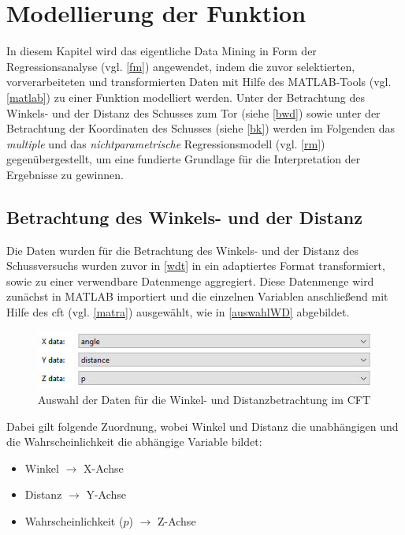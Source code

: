 \section{Modellierung der Funktion}
\label{mdf}
In diesem Kapitel wird das eigentliche Data Mining in Form der Regressionsanalyse (vgl. \vref{fm}) angewendet, indem die zuvor selektierten, vorverarbeiteten und transformierten Daten mit Hilfe des MATLAB-Tools (vgl. \vref{matlab}) zu einer Funktion modelliert werden. Unter der Betrachtung des Winkels- und der Distanz des Schusses zum Tor (siehe \vref{bwd}) sowie unter der Betrachtung der Koordinaten des Schusses (siehe \vref{bk}) werden im Folgenden das \textit{multiple} und das \textit{nichtparametrische} Regressionsmodell (vgl. \vref{rm}) gegenübergestellt, um eine fundierte Grundlage für die Interpretation der Ergebnisse zu gewinnen.


\subsection{Betrachtung des Winkels- und der Distanz}
\label{bwd}
Die Daten wurden für die Betrachtung des Winkels- und der Distanz des Schussversuchs wurden zuvor in \vref{wdt} in ein adaptiertes Format transformiert, sowie zu einer verwendbare Datenmenge aggregiert. Diese Datenmenge wird zunächst in MATLAB importiert und die einzelnen Variablen anschließend mit Hilfe des \gls{cft} (vgl. \vref{matra}) ausgewählt, wie in \vref{auswahlWD} abgebildet.

\begin{figure}[H]
\centering
\includegraphics[scale=0.8]{se-wa-jpg/auswahlWD}
\caption{Auswahl der Daten für die Winkel- und Distanzbetrachtung im CFT}
\label{auswahlWD}
\end{figure}

Dabei gilt folgende Zuordnung, wobei Winkel und Distanz die unabhängigen und die Wahrscheinlichkeit die abhängige Variable bildet:

\begin{itemize}
\item Winkel $\rightarrow$  X-Achse
\item Distanz $\rightarrow$ Y-Achse
\item Wahrscheinlichkeit ($p$) $\rightarrow$ Z-Achse
\end{itemize}

